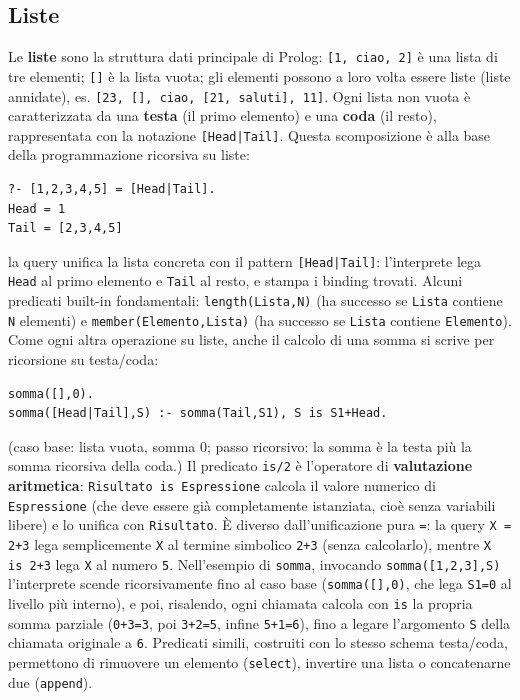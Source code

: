 \documentclass[a4paper,11pt]{article}
\begin{document}
\subsection{Liste}

Le \textbf{liste} sono la struttura dati principale di Prolog: \texttt{[1, ciao, 2]} è una lista di tre elementi; \texttt{[]} è la lista vuota; gli elementi possono a loro volta essere liste (liste annidate), es. \texttt{[23, [], ciao, [21, saluti], 11]}. Ogni lista non vuota è caratterizzata da una \textbf{testa} (il primo elemento) e una \textbf{coda} (il resto), rappresentata con la notazione \texttt{[Head|Tail]}. Questa scomposizione è alla base della programmazione ricorsiva su liste:
\begin{lstlisting}
?- [1,2,3,4,5] = [Head|Tail].
Head = 1
Tail = [2,3,4,5]
\end{lstlisting}
la query unifica la lista concreta con il pattern \texttt{[Head|Tail]}: l'interprete lega \texttt{Head} al primo elemento e \texttt{Tail} al resto, e stampa i binding trovati. Alcuni predicati built-in fondamentali: \texttt{length(Lista,N)} (ha successo se \texttt{Lista} contiene \texttt{N} elementi) e \texttt{member(Elemento,Lista)} (ha successo se \texttt{Lista} contiene \texttt{Elemento}). Come ogni altra operazione su liste, anche il calcolo di una somma si scrive per ricorsione su testa/coda:
\begin{lstlisting}
somma([],0).
somma([Head|Tail],S) :- somma(Tail,S1), S is S1+Head.
\end{lstlisting}
(caso base: lista vuota, somma 0; passo ricorsivo: la somma è la testa più la somma ricorsiva della coda.) Il predicato \texttt{is/2} è l'operatore di \textbf{valutazione aritmetica}: \texttt{Risultato is Espressione} calcola il valore numerico di \texttt{Espressione} (che deve essere già completamente istanziata, cioè senza variabili libere) e lo unifica con \texttt{Risultato}. È diverso dall'unificazione pura \texttt{=}: la query \texttt{X = 2+3} lega semplicemente \texttt{X} al termine simbolico \texttt{2+3} (senza calcolarlo), mentre \texttt{X is 2+3} lega \texttt{X} al numero \texttt{5}. Nell'esempio di \texttt{somma}, invocando \texttt{somma([1,2,3],S)} l'interprete scende ricorsivamente fino al caso base (\texttt{somma([],0)}, che lega \texttt{S1=0} al livello più interno), e poi, risalendo, ogni chiamata calcola con \texttt{is} la propria somma parziale (\texttt{0+3=3}, poi \texttt{3+2=5}, infine \texttt{5+1=6}), fino a legare l'argomento \texttt{S} della chiamata originale a \texttt{6}. Predicati simili, costruiti con lo stesso schema testa/coda, permettono di rimuovere un elemento (\texttt{select}), invertire una lista o concatenarne due (\texttt{append}).
\end{document}
